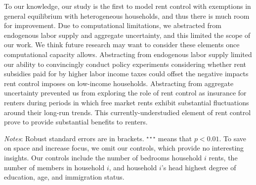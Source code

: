 \documentclass[parskip=full]{article}
\newenvironment{fignote2}[1]
{
\par
\medskip
\begin{minipage}{#1}
\footnotesize
}
{
\end{minipage}
}
\begin{document}
To our knowledge, our study is the first to model rent control with exemptions in general equilibrium with heterogeneous households, and thus there is much room for improvement. Due to computational limitations, we abstracted from endogenous labor supply and aggregate uncertainty, and this limited the scope of our work. We think future research may want to consider these elements once computational capacity allows. Abstracting from endogenous labor supply limited our ability to convincingly conduct policy experiments considering whether rent subsidies paid for by higher labor income taxes could offset the negative impacts rent control imposes on low-income households. Abstracting from aggregate uncertainty prevented us from exploring the role of rent control as insurance for renters during periods in which free market rents exhibit substantial fluctuations around their long-run trends. This currently-understudied element of rent control prove to provide substantial benefits to renters.



  
\begin{table}[H]
    \centering
    \caption{Income difference between renters in the controlled and free markets}
    \vspace{-0.5cm}
    \label{tab:renter_income_gap}
    
    \vspace{-0.5cm}
    \begin{fignote2}{0.4\textwidth}
    \textit{Notes}: Robust standard errors are in brackets. $^{\star\star\star}$ means that $p<0.01$. To save on space and increase focus, we omit our controls, which provide no interesting insights. Our controls include the number of bedrooms household $i$ rents, the number of members in household $i$, and household $i$'s head highest degree of education, age, and immigration status.
    \end{fignote2}
\end{table}
    
\end{document}
